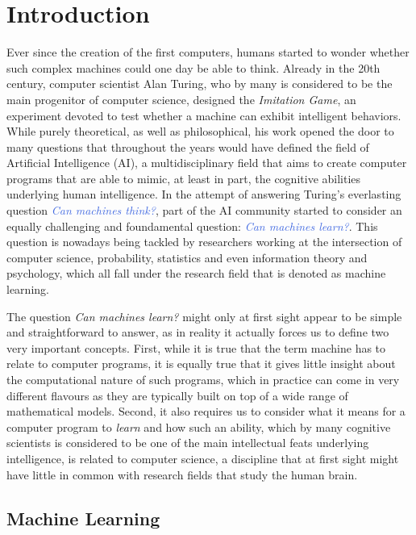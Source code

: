 \chapter{Introduction}
\label{ch:introduction}

Ever since the creation of the first computers, humans started to wonder whether such complex machines could one day be able to think. Already in the 20th century, computer scientist Alan Turing, who by many is considered to be the main progenitor of computer science, designed the \textit{Imitation Game}, an experiment devoted to test whether a machine can exhibit intelligent behaviors. While purely theoretical, as well as philosophical, his work opened the door to many questions that throughout the years would have defined the field of Artificial Intelligence (AI), a multidisciplinary field that aims to create computer programs that are able to mimic, at least in part, the cognitive abilities underlying human intelligence. In the attempt of answering Turing's everlasting question \textcolor{RoyalBlue}{\textit{Can machines think?}}, part of the AI community started to consider an equally challenging and foundamental question: \textcolor{RoyalBlue}{\textit{Can machines learn?}}. This question is nowadays being tackled by researchers working at the intersection of computer science, probability, statistics and even information theory and psychology, which all fall under the research field that is denoted as machine learning.

The question \textit{Can machines learn?} might only at first sight appear to be simple and straightforward to answer, as in reality it actually forces us to define two very important concepts. First, while it is true that the term machine has to relate to computer programs, it is equally true that it gives little insight about the computational nature of such programs, which in practice can come in very different flavours as they are typically built on top of a wide range of mathematical models. Second, it also requires us to consider what it means for a computer program to \textit{learn} and how such an ability, which by many cognitive scientists is considered to be one of the main intellectual feats underlying intelligence, is related to computer science, a discipline that at first sight might have little in common with research fields that study the human brain. 

\section{Machine Learning}

